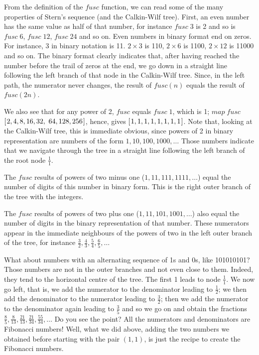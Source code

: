 \documentclass[tikz]{scrreprt}
\newcommand{\Varid}[1]{\mathit{#1}}
\begin{document}
From the definition of the \ensuremath{\Varid{fusc}} function,
we can read some of the many properties
of Stern's sequence (and the Calkin-Wilf tree).
First, an even number has the same value
as half of that number, for instance
\ensuremath{\Varid{fusc}\;\mathrm{3}} is 2 and so is \ensuremath{\Varid{fusc}\;\mathrm{6}},
\ensuremath{\Varid{fusc}\;\mathrm{12}}, \ensuremath{\Varid{fusc}\;\mathrm{24}} and so on.
Even numbers in binary format
end on zeros. For instance,
3 in binary notation is 11.
$2 \times 3$ is 110,
$2 \times 6$ is 1100,
$2 \times 12$ is 11000 and so on.
The binary format clearly indicates that, after having
reached the number before the trail of zeros
at the end, we go down in a straight line
following the left branch of that node
in the Calkin-Wilf tree.
Since, in the left path, the numerator
never changes, the result of 
$fusc(n)$ equals the result of $fusc(2n)$.

We also see that for any power of 2,
\ensuremath{\Varid{fusc}} equals \ensuremath{\Varid{fusc}\;\mathrm{1}}, which is 1;
\ensuremath{\Varid{map}\;\Varid{fusc}} \ensuremath{[\mskip1.5mu \mathrm{2},\mathrm{4},\mathrm{8},\mathrm{16},\mathrm{32},} \ensuremath{\mathrm{64},\mathrm{128},\mathrm{256}\mskip1.5mu]}, hence,
gives \ensuremath{[\mskip1.5mu \mathrm{1},\mathrm{1},\mathrm{1},\mathrm{1},\mathrm{1},\mathrm{1},\mathrm{1},\mathrm{1}\mskip1.5mu]}.
Note that, looking at the Calkin-Wilf tree,
this is immediate obvious, since powers of 2
in binary representation are numbers of the form
$1,10,100,1000,\dots$
Those numbers indicate that 
we navigate through the tree in a straight line
following the left branch of the root node $\frac{1}{1}$.

The \ensuremath{\Varid{fusc}} results of powers of two minus one ($1,11,111,1111,\dots$)
equal the number of digits of this number in binary form.
This is the right outer branch
of the tree with the integers.

The \ensuremath{\Varid{fusc}} results of powers of two plus one ($1,11,101,1001,\dots$)
also equal the number of digits
in the binary representation of that number.
These numerators appear in the immediate neighbours
of the powers of two in the left outer branch of the tree,
for instance 
$\frac{3}{2},
 \frac{4}{3},
 \frac{5}{4},
 \frac{6}{5}, \dots$

What about numbers with an alternating sequence
of 1s and 0s, like 101010101?
Those numbers are not in the outer branches
and not even close to them. Indeed, they 
tend to the horizontal centre of the tree.
The first 1 leads to node $\frac{1}{1}$.
We now go left, that is,
we add the numerator to the denominator leading
to $\frac{1}{2}$; we then add the denominator
to the numerator leading to $\frac{3}{2}$;
then we add the numerator to the denominator again
leading to $\frac{3}{5}$ 
and so we go on and obtain the fractions
$\frac{8}{5},
 \frac{8}{13},
 \frac{21}{13},
 \frac{21}{34},
 \frac{55}{34},\dots$
Do you see the point?
All the numerators and denominators are Fibonacci numbers!
Well, what we did above,
adding the two numbers we obtained before
starting with the pair $(1,1)$,
is just the recipe
to create the Fibonacci numbers.
\end{document}
